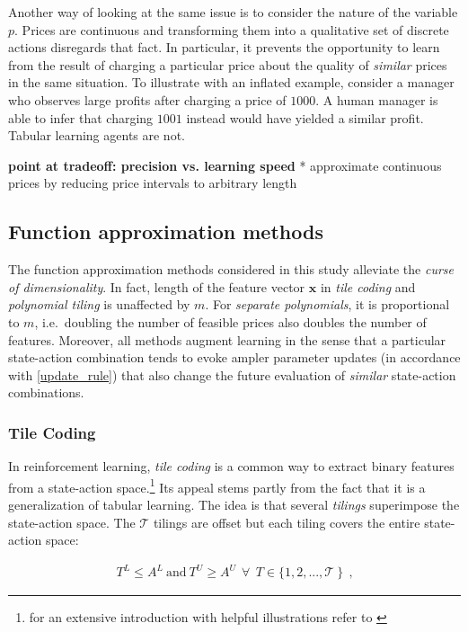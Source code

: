 Another way of looking at the same issue is to consider the nature of the variable $p$. Prices are continuous and transforming them into a qualitative set of discrete actions disregards that fact. In particular, it prevents the opportunity to learn from the result of charging a particular price about the quality of \emph{similar} prices in the same situation. To illustrate with an inflated example, consider a manager who observes large profits after charging a price of $1000$. A human manager is able to infer that charging $1001$ instead would have yielded a similar profit. Tabular learning agents are not.


\textbf{point at tradeoff: precision vs. learning speed}
			* approximate continuous prices by reducing price intervals to arbitrary length



\subsection{Function approximation methods}

The function approximation methods considered in this study alleviate the \emph{curse of dimensionality}. In fact, length of the feature vector $\boldsymbol{x}$ in \emph{tile coding} and \emph{polynomial tiling} is unaffected by $m$. For \emph{separate polynomials}, it is proportional to $m$, i.e.\ doubling the number of feasible prices also doubles the number of features. Moreover, all methods augment learning in the sense that a particular state-action combination tends to evoke ampler parameter updates (in accordance with \autoref{update_rule}) that also change the future evaluation of \emph{similar} state-action combinations.

\subsubsection{Tile Coding}\label{tile_coding}
In reinforcement learning, \emph{tile coding} is a common way to extract binary features from a state-action space.\footnote{for an extensive introduction with helpful illustrations refer to \textcite{sutton_reinforcement_2018}} Its appeal stems partly from the fact that it is a generalization of tabular learning. The idea is that several \emph{tilings} superimpose the state-action space. The $\mathcal{T}$ tilings are offset but each tiling covers the entire state-action space:

\begin{gather}
	 T^L \leq A^L  ~ \text{and} ~ T^U \geq A^U ~~ \forall  ~~ T \in \{1, 2, ..., \mathcal{T} ~ \} ~~ \text{,}
\end{gather}

